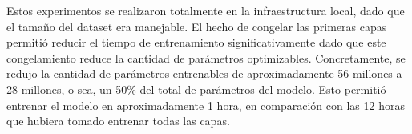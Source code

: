 Estos experimentos se realizaron totalmente en la infraestructura local, dado que el tamaño del dataset era manejable. El hecho de congelar las primeras capas permitió reducir el tiempo de entrenamiento significativamente dado que este congelamiento reduce la cantidad de parámetros optimizables. Concretamente, se redujo la cantidad de parámetros entrenables de aproximadamente 56 millones a 28 millones, o sea, un 50\% del total de parámetros del modelo. Esto permitió entrenar el modelo en aproximadamente 1 hora, en comparación con las 12 horas que hubiera tomado entrenar todas las capas.






